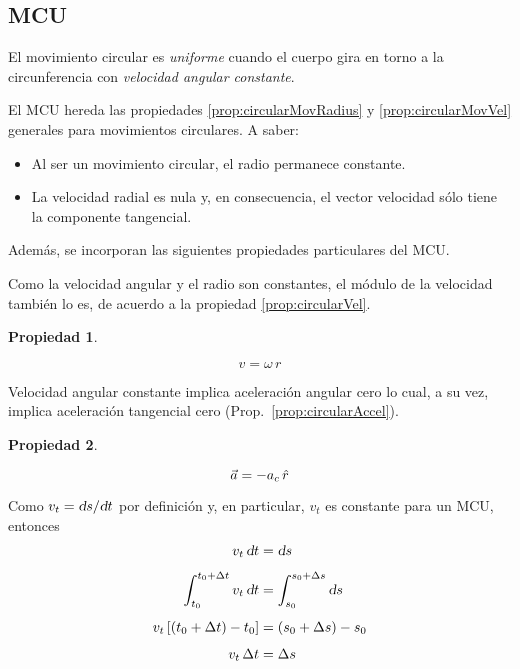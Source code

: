 \documentclass[a5paper,12pt,twoside]{book}
\newtheorem{prop}{{Propiedad}}[chapter]
\begin{document}
\subsection{MCU}
El movimiento circular es \emph{uniforme} cuando el cuerpo gira en torno a la circunferencia con \emph{velocidad angular constante}.

El MCU hereda las propiedades \ref{prop:circularMovRadius} y \ref{prop:circularMovVel} generales para movimientos circulares. A saber:
\begin{itemize}
    \item Al ser un movimiento circular, el radio permanece constante.
    
    \item La velocidad radial es nula y, en consecuencia, el vector velocidad sólo tiene la componente tangencial.
\end{itemize}

Además, se incorporan las siguientes propiedades particulares del MCU.

Como la velocidad angular y el radio son constantes, el módulo de la velocidad también lo es, de acuerdo a la propiedad \ref{prop:circularVel}.

\begin{mdframed}[style=MyFrame1]
    \begin{prop}
    \end{prop}
    \begin{equation*}
        v = \omega \, r
    \end{equation*}
\end{mdframed}

Velocidad angular constante implica aceleración angular cero lo cual, a su vez, implica aceleración tangencial cero (Prop.~\ref{prop:circularAccel}).

\begin{mdframed}[style=MyFrame1]
    \begin{prop}
    \end{prop}
    \begin{equation*}
        \Vec{a} = - a_c \, \hat{r}
    \end{equation*}
\end{mdframed}

Como $v_t = \textsl{d} s / \textsl{d} t$ por definición y, en particular, $v_t$ es constante para un MCU, entonces
\begin{align*}
    v_t \, \textsl{d} t &= \textsl{d} s
    \\[1ex]
    \int_{t_0}^{t_0+\Delta t} v_t \, \textsl{d} t &= \int_{s_0}^{s_0+\Delta s} \textsl{d} s
    \\[1ex]
    v_t \left[\left( t_0+\Delta t \right) - t_0\right] &= \left( s_0+\Delta s \right) - s_0
    \\[1ex]
    v_t \, \Delta t &= \Delta s
\end{align*}
\end{document}
